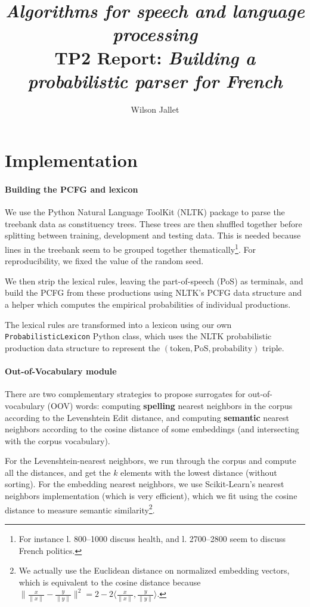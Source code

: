 \documentclass[11pt]{article}
\title{\textit{Algorithms for speech and language processing}\\
{\sffamily TP2 Report: \textit{Building a probabilistic parser for French}}}
\author{Wilson Jallet}
\begin{document}
\maketitle

\section{Implementation}

\paragraph{Building the PCFG and lexicon}

We use the Python Natural Language ToolKit (NLTK) \cite{nltkCitation} package to parse the treebank data as constituency trees. These trees are then shuffled together before splitting between training, development and testing data. This is needed because lines in the treebank seem to be grouped together thematically\footnote{For instance l. 800--1000 discuss health, and l. 2700--2800 seem to discuss French politics.}. For reproducibility, we fixed the value of the random seed.

We then strip the lexical rules, leaving the part-of-speech (PoS) as terminals, and build the PCFG from these productions using NLTK's PCFG data structure and a helper which computes the empirical probabilities of individual productions.

The lexical rules are transformed into a lexicon using our own \lstinline|ProbabilisticLexicon| Python class, which uses the NLTK probabilistic production data structure to represent the $(\mathrm{token}, \mathrm{PoS}, \mathrm{probability})$ triple.



\paragraph{Out-of-Vocabulary module}

There are two complementary strategies to propose surrogates for out-of-vocabulary (OOV) words: computing \textbf{spelling} nearest neighbors in the corpus according to the Levenshtein Edit distance, and computing \textbf{semantic} nearest neighbors according to the cosine distance of some embeddings (and intersecting with the corpus vocabulary).

For the Levenshtein-nearest neighbors, we run through the corpus and compute all the distances, and get the $k$ elements with the lowest distance (without sorting).
For the embedding nearest neighbors, we use Scikit-Learn's nearest neighbors implementation \cite{scikit-learn} (which is very efficient), which we fit using the cosine distance to measure semantic similarity\footnote{We actually use the Euclidean distance on normalized embedding vectors, which is equivalent to the cosine distance because $\|\frac{x}{\|x\|} - \frac{y}{\|y\|}\|^2 = 2 - 2\langle \frac{x}{\|x\|}, \frac{y}{\|y\|}\rangle$.}.
\end{document}
